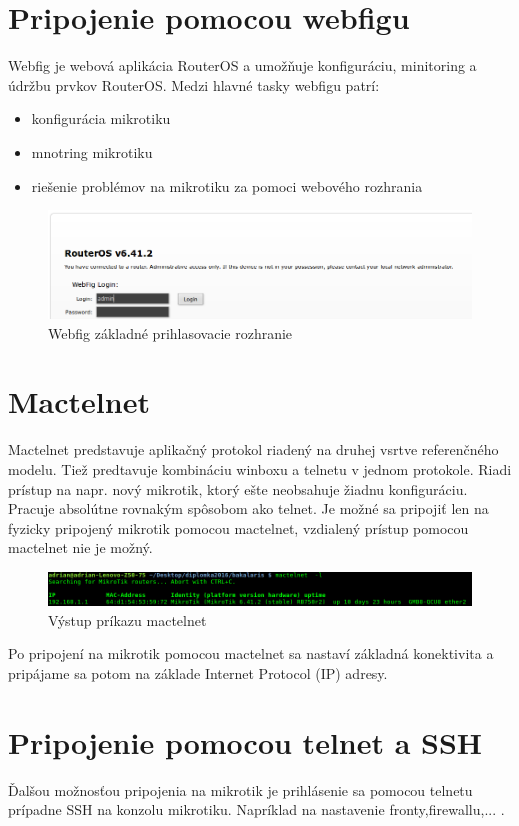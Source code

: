 \section{Pripojenie pomocou webfigu}
Webfig\cite{webfig} je webová aplikácia RouterOS a umožňuje konfiguráciu, minitoring a údržbu prvkov RouterOS. Medzi hlavné tasky webfigu patrí:\begin{itemize}
\item konfigurácia mikrotiku
\item mnotring mikrotiku
\item riešenie problémov na mikrotiku za pomoci webového rozhrania
\end{itemize}
\begin{figure}[H]
\centering
\includegraphics[scale=0.4]{../text/webfig.png}
\caption{Webfig základné prihlasovacie rozhranie}
\label{fig:webfig}
\end{figure} 
\section{Mactelnet}
Mactelnet\cite{mactelnet} predstavuje aplikačný protokol riadený na druhej vsrtve referenčného modelu. Tiež predtavuje kombináciu winboxu  a telnetu v jednom protokole. Riadi prístup na napr. nový mikrotik, ktorý ešte neobsahuje žiadnu konfiguráciu. Pracuje absolútne rovnakým spôsobom ako telnet. Je možné sa pripojiť len na fyzicky pripojený mikrotik pomocou mactelnet, vzdialený prístup pomocou mactelnet nie je možný. 
\begin{figure}[H]
\centering
\includegraphics[scale=0.4]{../text/mactelnet.png}
\caption{Výstup príkazu mactelnet}
\label{fig:webfig}
\end{figure}
Po pripojení na mikrotik pomocou mactelnet sa nastaví základná konektivita a pripájame sa potom na základe Internet Protocol (IP) adresy. 
\section{Pripojenie pomocou telnet a SSH}
Ďalšou možnosťou pripojenia na mikrotik je prihlásenie sa pomocou telnetu\cite{telnet} prípadne SSH\cite{ssh} na konzolu mikrotiku. Napríklad na nastavenie fronty,firewallu,... .
